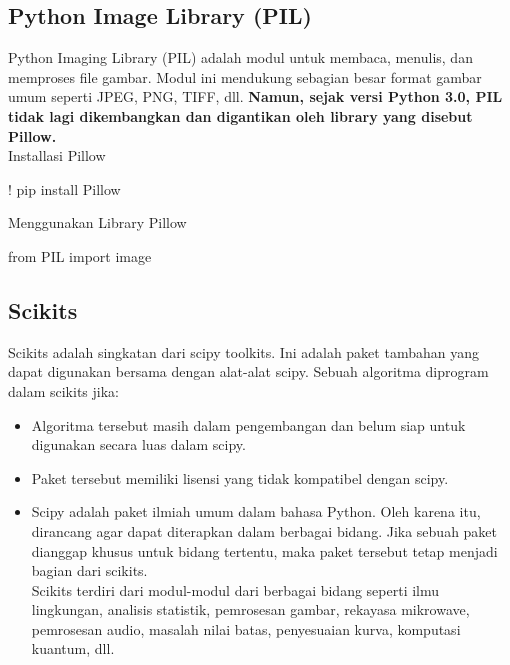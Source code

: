 \documentclass[
  letterpaper,
  DIV=11,
  numbers=noendperiod]{scrreprt}
\newenvironment{Shaded}{\begin{snugshade}}{\end{snugshade}}
\newcommand{\ImportTok}[1]{\textcolor[rgb]{0.00,0.46,0.62}{#1}}
\newcommand{\NormalTok}[1]{\textcolor[rgb]{0.00,0.23,0.31}{#1}}
\newcommand{\OperatorTok}[1]{\textcolor[rgb]{0.37,0.37,0.37}{#1}}
\providecommand{\tightlist}{%
  \setlength{\itemsep}{0pt}\setlength{\parskip}{0pt}}\usepackage{longtable,booktabs,array}
\begin{document}
\hypertarget{python-image-library-pil}{%
\subsection*{Python Image Library
(PIL)}\label{python-image-library-pil}}

Python Imaging Library (PIL) adalah modul untuk membaca, menulis, dan
memproses file gambar. Modul ini mendukung sebagian besar format gambar
umum seperti JPEG, PNG, TIFF, dll. \textbf{Namun, sejak versi Python
3.0, PIL tidak lagi dikembangkan dan digantikan oleh library yang
disebut Pillow.}\\
Installasi Pillow

\begin{Shaded}
\begin{Highlighting}[]
\OperatorTok{!}\NormalTok{ pip install Pillow}
\end{Highlighting}
\end{Shaded}

Menggunakan Library Pillow

\begin{Shaded}
\begin{Highlighting}[]
\ImportTok{from}\NormalTok{ PIL }\ImportTok{import}\NormalTok{ image}
\end{Highlighting}
\end{Shaded}

\hypertarget{scikits}{%
\subsection*{Scikits}\label{scikits}}

Scikits adalah singkatan dari scipy toolkits. Ini adalah paket tambahan
yang dapat digunakan bersama dengan alat-alat scipy. Sebuah algoritma
diprogram dalam scikits jika:

\begin{itemize}
\tightlist
\item
  Algoritma tersebut masih dalam pengembangan dan belum siap untuk
  digunakan secara luas dalam scipy.\\
\item
  Paket tersebut memiliki lisensi yang tidak kompatibel dengan scipy.\\
\item
  Scipy adalah paket ilmiah umum dalam bahasa Python. Oleh karena itu,
  dirancang agar dapat diterapkan dalam berbagai bidang. Jika sebuah
  paket dianggap khusus untuk bidang tertentu, maka paket tersebut tetap
  menjadi bagian dari scikits.\\
  Scikits terdiri dari modul-modul dari berbagai bidang seperti ilmu
  lingkungan, analisis statistik, pemrosesan gambar, rekayasa mikrowave,
  pemrosesan audio, masalah nilai batas, penyesuaian kurva, komputasi
  kuantum, dll.
\end{itemize}
\end{document}
